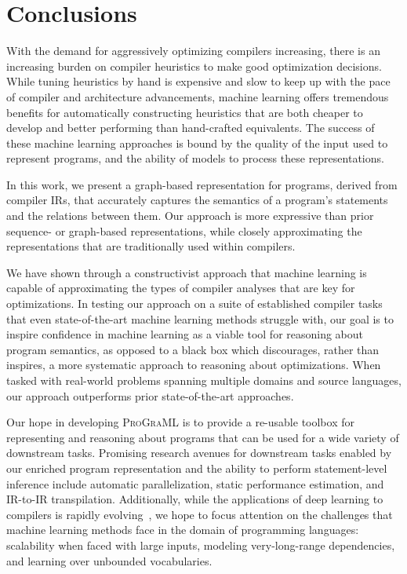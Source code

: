 \section{Conclusions}

With the demand for aggressively optimizing compilers increasing,
there is an increasing burden on compiler heuristics to make good
optimization decisions. While tuning heuristics by hand is expensive
and slow to keep up with the pace of compiler and architecture
advancements, machine learning offers tremendous benefits for
automatically constructing heuristics that are both cheaper to develop
and better performing than hand-crafted equivalents. The success of
these machine learning approaches is bound by the quality of the input
used to represent programs, and the ability of models to process these
representations.

In this work, we present a graph-based representation for programs,
derived from compiler IRs, that accurately captures the semantics of a
program's statements and the relations between them. Our approach is
more expressive than prior sequence- or graph-based representations,
while closely approximating the representations that are traditionally
used within compilers.

We have shown through a constructivist approach that machine learning
is capable of approximating the types of compiler analyses that are
key for optimizations. In testing our approach on a suite of
established compiler tasks that even state-of-the-art machine learning
methods struggle with, our goal is to inspire confidence in machine
learning as a viable tool for reasoning about program semantics, as
opposed to a black box which discourages, rather than inspires, a more
systematic approach to reasoning about optimizations. When tasked with
real-world problems spanning multiple domains and source languages,
our approach outperforms prior state-of-the-art approaches.

Our hope in developing \textsc{ProGraML} is to provide a re-usable
toolbox for representing and reasoning about programs that can be used
for a wide variety of downstream tasks. Promising research avenues for
downstream tasks enabled by our enriched program representation and
the ability to perform statement-level inference include automatic
parallelization, static performance estimation, and IR-to-IR
transpilation. Additionally, while the applications of deep learning
to compilers is rapidly evolving~\cite{Allamanis2017a,Cummins2020}, we
hope to focus attention on the challenges that machine learning
methods face in the domain of programming languages: scalability when
faced with large inputs, modeling very-long-range dependencies, and
learning over unbounded vocabularies.
